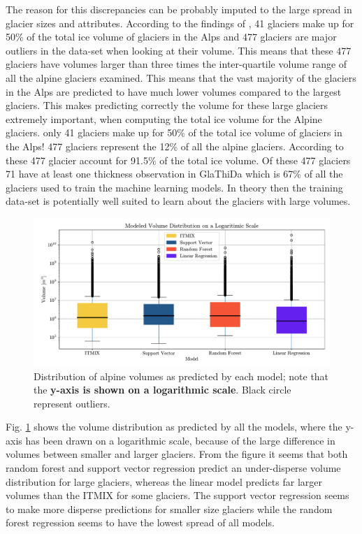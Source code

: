 The reason for this discrepancies can be probably imputed to the large spread in glacier sizes and attributes. According to the findings of \citet{Farinotti2019}, 41 glaciers make up for 50\% of the total ice volume of glaciers in the Alps and 477 glaciers are major outliers in the data-set when looking at their volume. This means that these 477 glaciers have volumes larger than three times the inter-quartile volume range of all the alpine glaciers examined. This means that the vast majority of the glaciers in the Alps are predicted to have much lower volumes compared to the largest glaciers. This makes predicting correctly the volume for these large glaciers extremely important, when computing the total ice volume for the Alpine glaciers. only 41 glaciers make up for 50\% of the total ice volume of glaciers in the Alps! 477 glaciers represent the 12\% of all the alpine glaciers. According to \citet{Farinotti2019} these 477 glacier account for 91.5\% of the total ice volume.  Of these 477 glaciers 71 have at least one thickness observation in GlaThiDa which is 67\% of all the glaciers used to train the machine learning models. In theory then the training data-set is potentially well suited to learn about the glaciers with large volumes.  

\begin{figure}[!tp]
	\centering		  
	\includegraphics[width=1.\textwidth]{figures/vol_box.pdf}
	\caption{Distribution of alpine volumes as predicted by each model; note that the \textbf{y-axis is shown on a logarithmic scale}. Black circle represent outliers.}
	\label{fig:vol-dist}
\end{figure}

Fig. \ref{fig:vol-dist} shows the volume distribution as predicted by all the models, where the y-axis has been drawn on a logarithmic scale, because of the large difference in volumes between smaller and larger glaciers. From the figure it seems that both random forest and support vector regression predict an under-disperse volume distribution for large glaciers, whereas the linear model predicts far larger volumes than the ITMIX for some glaciers. The support vector regression seems to make more disperse predictions for smaller size glaciers while the random forest regression seems to have the lowest spread of all models.

